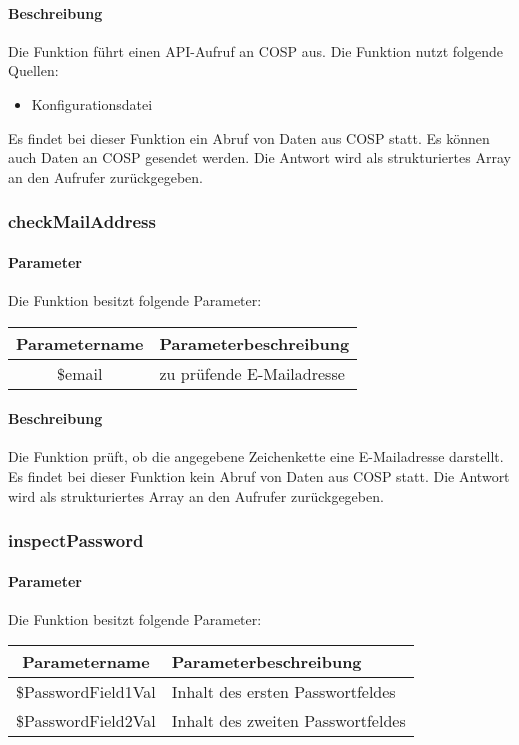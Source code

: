 \paragraph{Beschreibung} Die Funktion führt einen API-Aufruf an {\glqq COSP\grqq} aus. Die Funktion nutzt folgende Quellen:
\begin{itemize}
	\item Konfigurationsdatei
\end{itemize}
Es findet bei dieser Funktion ein Abruf von Daten aus {\glqq COSP\grqq} statt. Es können auch Daten an {\glqq COSP\grqq} gesendet werden. Die Antwort wird als strukturiertes Array an den Aufrufer zurückgegeben.
\subsubsection{checkMailAddress}
\paragraph{Parameter} Die Funktion besitzt folgende Parameter:
\begin{table}[H]
	\begin{tabular}{|c|p{11cm}|}
		\hline
		\textbf{Parametername} & \textbf{Parameterbeschreibung} \\ \hline
		\$email & zu prüfende E-Mailadresse \\ \hline
	\end{tabular}
\end{table}
\paragraph{Beschreibung} Die Funktion prüft, ob die angegebene Zeichenkette eine E-Mailadresse darstellt. Es findet bei dieser Funktion kein Abruf von Daten aus {\glqq COSP\grqq} statt. Die Antwort wird als strukturiertes Array an den Aufrufer zurückgegeben.
\subsubsection{inspectPassword}
\paragraph{Parameter} Die Funktion besitzt folgende Parameter:
\begin{table}[H]
	\begin{tabular}{|c|p{11cm}|}
		\hline
		\textbf{Parametername} & \textbf{Parameterbeschreibung} \\ \hline
		\$PasswordField1Val & Inhalt des ersten Passwortfeldes \\ \hline
		\$PasswordField2Val & Inhalt des zweiten Passwortfeldes \\ \hline
	\end{tabular}
\end{table}
